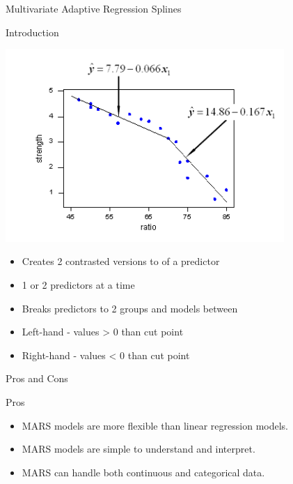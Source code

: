 \documentclass[ignorenonframetext,]{beamer}
\providecommand{\tightlist}{%
  \setlength{\itemsep}{0pt}\setlength{\parskip}{0pt}}
\begin{document}
\begin{frame}{Multivariate Adaptive Regression Splines}

\begin{block}{Introduction}

\begin{center}\includegraphics[width=400px]{mars} \end{center}

\begin{itemize}
\tightlist
\item
  Creates 2 contrasted versions to of a predictor
\item
  1 or 2 predictors at a time
\item
  Breaks predictors to 2 groups and models between
\item
  Left-hand - values \textgreater{} 0 than cut point
\item
  Right-hand - values \textless{} 0 than cut point
\end{itemize}

\end{block}

\begin{block}{Pros and Cons}

\begin{block}{Pros}

\begin{itemize}
\tightlist
\item
  MARS models are more flexible than linear regression models.
\item
  MARS models are simple to understand and interpret.
\item
  MARS can handle both continuous and categorical data.
\end{itemize}

\end{block}


\end{block}
\end{frame}
\end{document}
